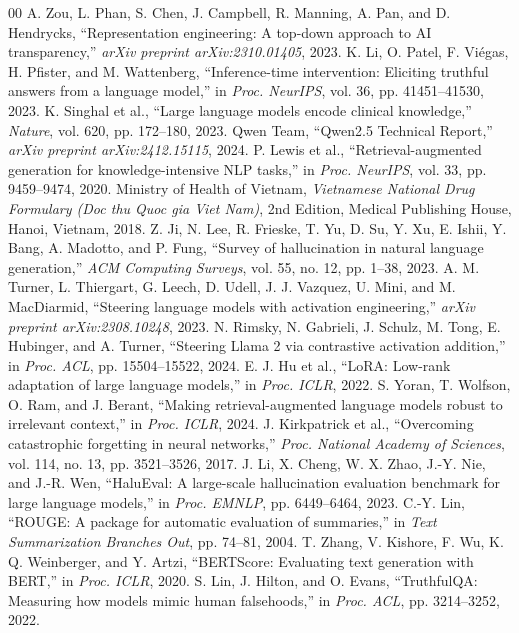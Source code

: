 \documentclass[conference]{IEEEtran}
\begin{document}
\begin{thebibliography}{00}
 A. Zou, L. Phan, S. Chen, J. Campbell, R. Manning, A. Pan, and D. Hendrycks, ``Representation engineering: A top-down approach to AI transparency,'' \textit{arXiv preprint arXiv:2310.01405}, 2023.
 K. Li, O. Patel, F. Vi\'egas, H. Pfister, and M. Wattenberg, ``Inference-time intervention: Eliciting truthful answers from a language model,'' in \textit{Proc. NeurIPS}, vol. 36, pp. 41451--41530, 2023.
 K. Singhal et al., ``Large language models encode clinical knowledge,'' \textit{Nature}, vol. 620, pp. 172--180, 2023.
 Qwen Team, ``Qwen2.5 Technical Report,'' \textit{arXiv preprint arXiv:2412.15115}, 2024.
 P. Lewis et al., ``Retrieval-augmented generation for knowledge-intensive NLP tasks,'' in \textit{Proc. NeurIPS}, vol. 33, pp. 9459--9474, 2020.
 Ministry of Health of Vietnam, \textit{Vietnamese National Drug Formulary (Doc thu Quoc gia Viet Nam)}, 2nd Edition, Medical Publishing House, Hanoi, Vietnam, 2018.
 Z. Ji, N. Lee, R. Frieske, T. Yu, D. Su, Y. Xu, E. Ishii, Y. Bang, A. Madotto, and P. Fung, ``Survey of hallucination in natural language generation,'' \textit{ACM Computing Surveys}, vol. 55, no. 12, pp. 1--38, 2023.
 A. M. Turner, L. Thiergart, G. Leech, D. Udell, J. J. Vazquez, U. Mini, and M. MacDiarmid, ``Steering language models with activation engineering,'' \textit{arXiv preprint arXiv:2308.10248}, 2023.
 N. Rimsky, N. Gabrieli, J. Schulz, M. Tong, E. Hubinger, and A. Turner, ``Steering Llama 2 via contrastive activation addition,'' in \textit{Proc. ACL}, pp. 15504--15522, 2024.
 E. J. Hu et al., ``LoRA: Low-rank adaptation of large language models,'' in \textit{Proc. ICLR}, 2022.
 S. Yoran, T. Wolfson, O. Ram, and J. Berant, ``Making retrieval-augmented language models robust to irrelevant context,'' in \textit{Proc. ICLR}, 2024.
 J. Kirkpatrick et al., ``Overcoming catastrophic forgetting in neural networks,'' \textit{Proc. National Academy of Sciences}, vol. 114, no. 13, pp. 3521--3526, 2017.
 J. Li, X. Cheng, W. X. Zhao, J.-Y. Nie, and J.-R. Wen, ``HaluEval: A large-scale hallucination evaluation benchmark for large language models,'' in \textit{Proc. EMNLP}, pp. 6449--6464, 2023.
 C.-Y. Lin, ``ROUGE: A package for automatic evaluation of summaries,'' in \textit{Text Summarization Branches Out}, pp. 74--81, 2004.
 T. Zhang, V. Kishore, F. Wu, K. Q. Weinberger, and Y. Artzi, ``BERTScore: Evaluating text generation with BERT,'' in \textit{Proc. ICLR}, 2020.
 S. Lin, J. Hilton, and O. Evans, ``TruthfulQA: Measuring how models mimic human falsehoods,'' in \textit{Proc. ACL}, pp. 3214--3252, 2022.
\end{thebibliography}
\end{document}
